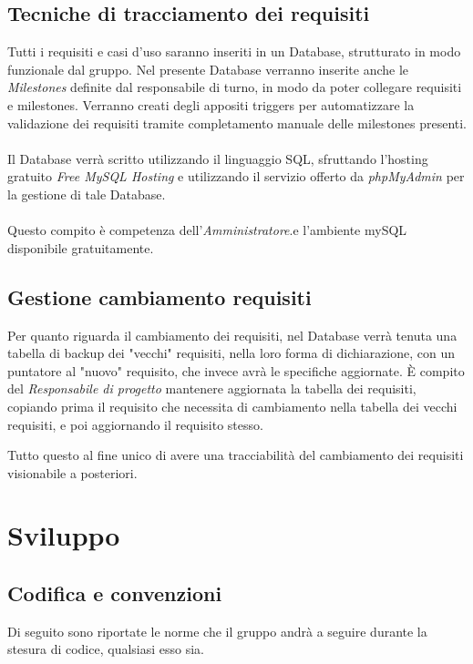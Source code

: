 \documentclass[a4paper]{report}
\begin{document}
	\subsection{Tecniche di tracciamento dei requisiti}
		Tutti i requisiti e casi d'uso saranno inseriti in un Database, strutturato in modo funzionale
		 dal gruppo. Nel presente Database verranno 	inserite anche le \emph{Milestones} definite 
		 dal responsabile di turno, in modo da poter collegare requisiti e milestones. Verranno 
		 creati degli appositi triggers per automatizzare la validazione dei requisiti tramite
		  completamento manuale delle	milestones presenti. 
		\\ \\ 
		Il Database verrà scritto utilizzando il linguaggio SQL, sfruttando l'hosting gratuito
		\emph{Free MySQL Hosting} e utilizzando il servizio offerto da \emph{phpMyAdmin} per
		la gestione di tale Database.
		\\ \\
		Questo compito è competenza dell'\emph{Amministratore}.e l'ambiente mySQL disponibile gratuitamente. 
	\subsection{Gestione cambiamento requisiti}
	Per quanto riguarda il cambiamento dei requisiti, nel Database verrà tenuta una tabella di backup dei "vecchi" requisiti, 
	nella loro forma di dichiarazione, con un puntatore al "nuovo" requisito, che invece avrà le specifiche aggiornate. È compito del
	\emph{Responsabile di progetto} mantenere aggiornata la tabella dei requisiti, copiando prima il requisito che necessita di cambiamento
	nella tabella dei vecchi requisiti, e poi aggiornando il requisito stesso.
	
	Tutto questo al fine unico di avere una tracciabilità del cambiamento dei requisiti visionabile a posteriori.
	\section{Sviluppo}
	\subsection{Codifica e convenzioni}
	Di seguito sono riportate le norme che il gruppo andrà a seguire durante la stesura di codice, qualsiasi esso sia.
\end{document}
